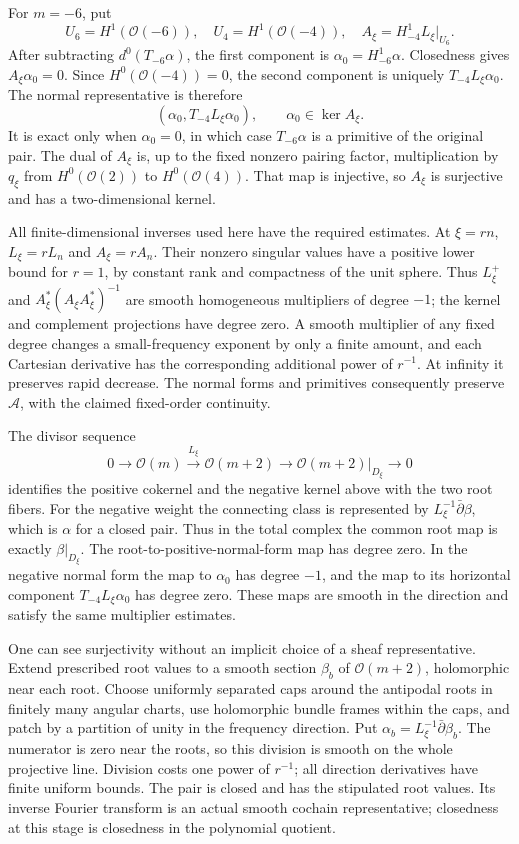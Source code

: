 \documentclass[
  english,
  11pt,
  reqno]{amsart}
\begin{document}
For \(m=-6\), put \[
U_6=H^1(\mathcal O(-6)),\quad
U_4=H^1(\mathcal O(-4)),\quad
A_\xi=H_{-4}^1L_\xi|_{U_6}.
\] After subtracting \(d^0(T_{-6}\alpha)\), the first component is
\(\alpha_0=H_{-6}^1\alpha\). Closedness gives \(A_\xi\alpha_0=0\). Since
\(H^0(\mathcal O(-4))=0\), the second component is uniquely
\(T_{-4}L_\xi\alpha_0\). The normal representative is therefore%
 \[
(\alpha_0,T_{-4}L_\xi\alpha_0),
\qquad \alpha_0\in\ker A_\xi.
\] It is exact only when \(\alpha_0=0\), in which case \(T_{-6}\alpha\)
is a primitive of the original pair. The dual of \(A_\xi\) is, up to the
fixed nonzero pairing factor, multiplication by \(q_\xi\) from
\(H^0(\mathcal O(2))\) to \(H^0(\mathcal O(4))\). That map is injective,
so \(A_\xi\) is surjective and has a two-dimensional kernel.

All finite-dimensional inverses used here have the required estimates.
At \(\xi=rn\), \(L_\xi=rL_n\) and \(A_\xi=rA_n\). Their nonzero singular
values have a positive lower bound for \(r=1\), by constant rank and
compactness of the unit sphere. Thus \(L_\xi^+\) and
\(A_\xi^*(A_\xi A_\xi^*)^{-1}\) are smooth homogeneous multipliers of
degree \(-1\); the kernel and complement projections have degree zero. A
smooth multiplier of any fixed degree changes a small-frequency exponent
by only a finite amount, and each Cartesian derivative has the
corresponding additional power of \(r^{-1}\). At infinity it preserves
rapid decrease. The normal forms and primitives consequently preserve
\(\mathscr A\), with the claimed fixed-order continuity.

The divisor sequence%
 \[
0\longrightarrow\mathcal O(m)
\xrightarrow{\,L_\xi\,}\mathcal O(m+2)
\longrightarrow\mathcal O(m+2)|_{D_\xi}\longrightarrow0
\] identifies the positive cokernel and the negative kernel above with
the two root fibers. For the negative weight the connecting class is
represented by \(L_\xi^{-1}\bar\partial\beta\), which is \(\alpha\) for
a closed pair. Thus in the total complex the common root map is exactly
\(\beta|_{D_\xi}\). The root-to-positive-normal-form map has degree
zero. In the negative normal form the map to \(\alpha_0\) has degree
\(-1\), and the map to its horizontal component \(T_{-4}L_\xi\alpha_0\)
has degree zero. These maps are smooth in the direction and satisfy the
same multiplier estimates.

One can see surjectivity without an implicit choice of a sheaf
representative. Extend prescribed root values to a smooth section
\(\beta_b\) of \(\mathcal O(m+2)\), holomorphic near each root. Choose
uniformly separated caps around the antipodal roots in finitely many
angular charts, use holomorphic bundle frames within the caps, and patch
by a partition of unity in the frequency direction. Put
\(\alpha_b=L_\xi^{-1}\bar\partial\beta_b\). The numerator is zero near
the roots, so this division is smooth on the whole projective line.
Division costs one power of \(r^{-1}\); all direction derivatives have
finite uniform bounds. The pair is closed and has the stipulated root
values. Its inverse Fourier transform is an actual smooth cochain
representative; closedness at this stage is closedness in the polynomial
quotient.
\end{document}
